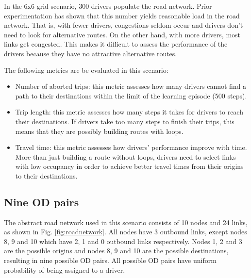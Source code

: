 \documentclass{RITA}
\begin{document}
In the 6x6 grid scenario, 300 drivers populate the road network. Prior experimentation has shown that this number yields reasonable load in the road network. That is, with fewer drivers, congestions seldom occur and drivers don't need to look for alternative routes. On the other hand, with more drivers, most links get congested. This makes it difficult to assess the performance of the drivers because they have no attractive alternative routes.

The following metrics are be evaluated in this scenario:

\begin{itemize}
  \item Number of aborted trips: this metric assesses how many drivers cannot find a path to their destinations within the limit of the learning episode (500 steps).
  \item Trip length: this metric assesses how many steps it takes for drivers to reach their destinations. If drivers take too many steps to finish their trips, this means that they are possibly building routes with loops.
 \item Travel time: this metric assesses how drivers' performance improve with time. More than just building a route without loops, drivers need to select links with low occupancy in order to achieve better travel times from their origins to their destinations.
\end{itemize}

\subsection{Nine OD pairs}
\label{sec:nineODDescription}
The abstract road network used in this scenario consists of 10 nodes and 24 links, as shown in Fig. \ref{fig:roadnetwork}. All nodes have 3 outbound links, except nodes 8, 9 and 10 which have 2, 1 and 0 outbound links respectively. Nodes 1, 2 and 3 are the possible origins and nodes 8, 9 and 10 are the possible destinations, resulting in nine possible OD pairs. All possible OD pairs have uniform probability of being assigned to a driver. %
\end{document}

